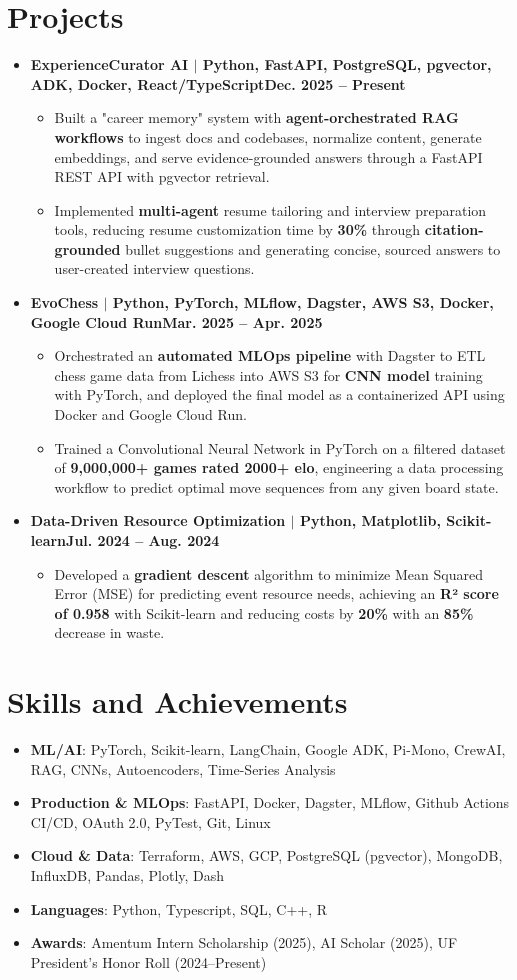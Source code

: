 \documentclass[letterpaper,10pt]{article}
\newcommand{\resumeSubHeadingListStart}{\begin{itemize}[leftmargin=0pt,label={},itemsep=2pt]}
\newcommand{\resumeSubHeadingListEnd}{\end{itemize}}
\newcommand{\resumeItemListStart}{\begin{itemize}[label=\textbullet,leftmargin=0.2in,itemsep=1pt]}
\newcommand{\resumeItemListEnd}{\end{itemize}}
\newcommand{\resumeItem}[1]{\item #1}
\begin{document}
\section{\textbf{Projects}}
\resumeSubHeadingListStart
  \item{\textbf{ExperienceCurator AI $|$ Python, FastAPI, PostgreSQL, pgvector, ADK, Docker, React/TypeScript}}\hfill\textbf{Dec. 2025 -- Present}
  \resumeItemListStart
  \resumeItem{Built a "career memory" system with \textbf{agent-orchestrated RAG workflows} to ingest docs and codebases, normalize content, generate embeddings, and serve evidence-grounded answers through a FastAPI REST API with pgvector retrieval.}
  \resumeItem{Implemented \textbf{multi-agent} resume tailoring and interview preparation tools, reducing resume customization time by \textbf{30\%} through \textbf{citation-grounded} bullet suggestions and generating concise, sourced answers to user-created interview questions.}
  \resumeItemListEnd
  \item{\textbf{EvoChess $|$ Python, PyTorch, MLflow, Dagster, AWS S3, Docker, Google Cloud Run}}\hfill\textbf{Mar. 2025 -- Apr. 2025}
  \resumeItemListStart
  \resumeItem{Orchestrated an \textbf{automated MLOps pipeline} with Dagster to ETL chess game data from Lichess into AWS S3 for \textbf{CNN model} training with PyTorch, and deployed the final model as a containerized API using Docker and Google Cloud Run.}
  \resumeItem{Trained a Convolutional Neural Network in PyTorch on a filtered dataset of \textbf{9,000,000+ games rated 2000+ elo}, engineering a data processing workflow to predict optimal move sequences from any given board state.}
  \resumeItemListEnd
  \item{\textbf{Data-Driven Resource Optimization $|$ Python, Matplotlib, Scikit-learn}}\hfill\textbf{Jul. 2024 -- Aug. 2024}
  \resumeItemListStart
    \resumeItem{Developed a \textbf{gradient descent} algorithm to minimize Mean Squared Error (MSE) for predicting event resource needs, achieving an \textbf{R² score of 0.958} with Scikit-learn and reducing costs by \textbf{20\%} with an \textbf{85\%} decrease in waste.}
  \resumeItemListEnd
\resumeSubHeadingListEnd

\section{\textbf{Skills and Achievements}}
\resumeSubHeadingListStart
  \item{\textbf{ML/AI}: PyTorch, Scikit-learn, LangChain, Google ADK, Pi-Mono, CrewAI, RAG, CNNs, Autoencoders, Time-Series Analysis}
  \item{\textbf{Production \& MLOps}: FastAPI, Docker, Dagster, MLflow, Github Actions CI/CD, OAuth 2.0, PyTest, Git, Linux}
  \item{\textbf{Cloud \& Data}: Terraform, AWS, GCP, PostgreSQL (pgvector), MongoDB, InfluxDB, Pandas, Plotly, Dash}
  \item{\textbf{Languages}: Python, Typescript, SQL, C++, R}
  \item{\textbf{Awards}: Amentum Intern Scholarship (2025), AI Scholar (2025), UF President's Honor Roll (2024--Present)}
\resumeSubHeadingListEnd
\end{document}
